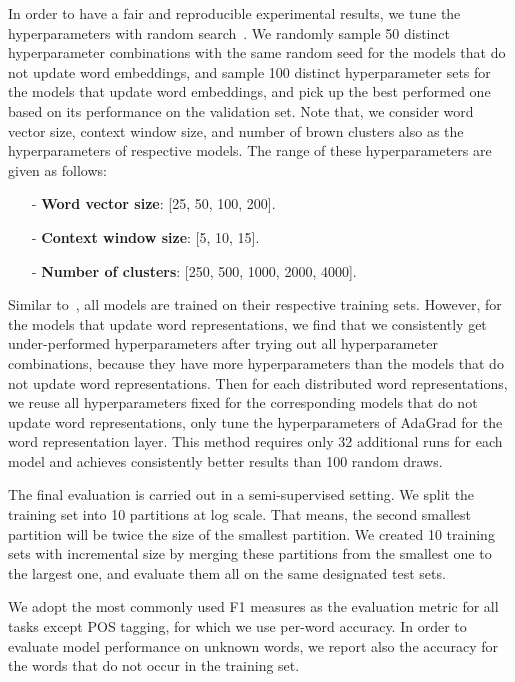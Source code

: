 In order to have a fair and reproducible experimental results, we tune the hyperparameters with random search~\cite{bergstra2012random}. We randomly sample 50 distinct hyperparameter combinations with the same random seed for the models that do not update word embeddings, and sample 100 distinct hyperparameter sets for the models that update word embeddings, and pick up the best performed one based on its performance on the validation set. Note that, we consider word vector size, context window size, and number of brown clusters also as the hyperparameters of respective models. The range of these hyperparameters are given as follows:

\begin{small}
\begin{itemize}
\item[-]\textbf{Word vector size}: [25, 50, 100, 200].
\item[-]\textbf{Context window size}: [5, 10, 15].
\item[-]\textbf{Number of clusters}: [250, 500, 1000, 2000, 4000]. 
\end{itemize}
\end{small}

Similar to~\cite{turian2010word}, all models are trained on their respective training sets. However, for the models that update word representations, we find that we consistently get under-performed hyperparameters after trying out all hyperparameter combinations, because they have more hyperparameters than the models that do not update word representations. Then for each distributed word representations, we reuse all hyperparameters fixed for the corresponding models that do not update word representations, only tune the hyperparameters of AdaGrad for the word representation layer. This method requires only 32 additional runs for each model and achieves consistently better results than 100 random draws.

The final evaluation is carried out in a semi-supervised setting. We split the training set into 10 partitions at log scale. That means, the second smallest partition will be twice the size of the smallest partition. We created 10 training sets with incremental size by merging these partitions from the smallest one to the largest one, and evaluate them all on the same designated test sets. 

We adopt the most commonly used F1 measures as the evaluation metric for all tasks except POS tagging, for which we use per-word accuracy. In order to evaluate model performance on unknown words, we report also the accuracy for the words that do not occur in the training set.

